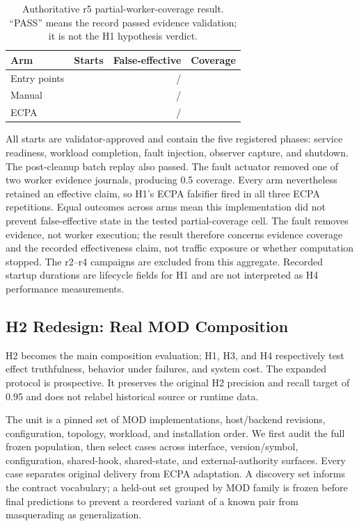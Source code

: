 \documentclass[letterpaper,twocolumn,10pt]{article}
\begin{document}
\begin{table}[t]
\centering
\small
\caption{Authoritative r5 partial-worker-coverage result.  ``PASS'' means the
record passed evidence validation; it is not the H1 hypothesis verdict.}
\begin{tabular}{@{}lrrr@{}}
\toprule
Arm & Starts & False-effective & Coverage \\
\midrule
Entry points & \ECPAMinimumStarts{} & \ECPAHOneFalseEffectiveNumerator{}/\ECPAHOneFalseEffectiveDenominator{} & \ECPAHOneCoverage{} \\
Manual & \ECPAMinimumStarts{} & \ECPAHOneFalseEffectiveNumerator{}/\ECPAHOneFalseEffectiveDenominator{} & \ECPAHOneCoverage{} \\
ECPA & \ECPAMinimumStarts{} & \ECPAHOneFalseEffectiveNumerator{}/\ECPAHOneFalseEffectiveDenominator{} & \ECPAHOneCoverage{} \\
\bottomrule
\end{tabular}
\end{table}

All \ECPAFormalStarts{} starts are validator-approved and contain the five
registered phases: service readiness, workload completion, fault injection,
observer capture, and shutdown.  The post-cleanup batch replay also passed.
The fault actuator removed one of two worker evidence journals, producing 0.5
coverage.  Every arm nevertheless retained an effective claim, so H1's ECPA
falsifier fired in all three ECPA repetitions.  Equal outcomes across arms mean
this implementation did not prevent false-effective state in the tested
partial-coverage cell.  The fault removes evidence, not worker execution; the
result therefore concerns evidence coverage and the recorded effectiveness
claim, not traffic exposure or whether computation stopped.  The r2--r4 campaigns
are excluded from this aggregate.  Recorded startup durations are lifecycle
fields for H1 and are not interpreted as H4 performance measurements.

\subsection{H2 Redesign: Real MOD Composition}
\label{sec:h2-redesign}
H2 becomes the main composition evaluation; H1, H3, and H4 respectively
test effect truthfulness, behavior under failures, and system cost. The
expanded protocol is prospective. It preserves the original H2 precision and
recall target of 0.95 and does not relabel historical source or runtime data.

The unit is a pinned set of MOD implementations, host/backend revisions,
configuration, topology, workload, and installation order. We first audit the
full frozen population, then select cases across interface, version/symbol,
configuration, shared-hook, shared-state, and external-authority surfaces.
Every case separates original delivery from ECPA adaptation. A discovery set
informs the contract vocabulary; a held-out set grouped by MOD family is
frozen before final predictions to prevent a reordered variant of a known
pair from masquerading as generalization.
\end{document}
